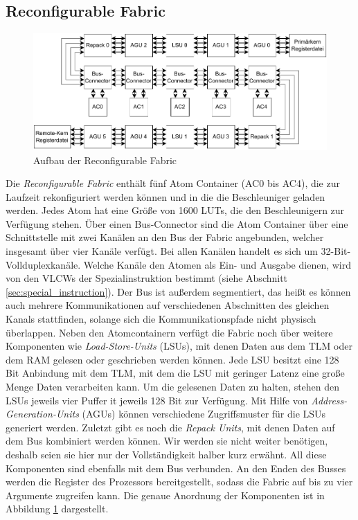\subsection{Reconfigurable Fabric}
\begin{figure}
    \center
    \includegraphics{images/Icore_Fabric.pdf}
    \caption{Aufbau der Reconfigurable Fabric}
    \label{fig:icore_fabric}
\end{figure}
Die \textit{Reconfigurable Fabric} enthält fünf Atom Container (AC0 bis AC4), die zur Laufzeit rekonfiguriert werden können und in die die Beschleuniger geladen werden.
Jedes Atom hat eine Größe von 1600 LUTs, die den Beschleunigern zur Verfügung stehen. Über einen Bus-Connector sind die Atom Container über eine Schnittstelle mit zwei Kanälen
an den Bus der Fabric angebunden, welcher insgesamt über vier Kanäle verfügt. Bei allen Kanälen handelt es sich um 32-Bit-Vollduplexkanäle.
Welche Kanäle den Atomen als Ein- und Ausgabe dienen, wird von den VLCWs der Spezialinstruktion bestimmt (siehe Abschnitt \ref{sec:special_instruction}). 
Der Bus ist außerdem segmentiert, das heißt es können auch mehrere Kommunikationen auf verschiedenen Abschnitten des gleichen Kanals stattfinden,
solange sich die Kommunikationspfade nicht physisch überlappen. Neben den Atomcontainern verfügt die Fabric
noch über weitere Komponenten wie \textit{Load-Store-Units} (LSUs), mit denen Daten aus dem TLM oder dem RAM gelesen oder geschrieben werden können.
Jede LSU besitzt eine 128 Bit Anbindung mit dem TLM, mit dem die LSU mit geringer Latenz eine große Menge Daten verarbeiten kann.
Um die gelesenen Daten zu halten, stehen den LSUs jeweils vier Puffer it jeweils 128 Bit zur Verfügung. Mit Hilfe von \textit{Address-Generation-Units} (AGUs)
können verschiedene Zugriffsmuster für die LSUs generiert werden. Zuletzt gibt es noch die \textit{Repack Units}, mit denen Daten auf dem Bus
kombiniert werden können. Wir werden sie nicht weiter benötigen, deshalb seien sie hier nur der Vollständigkeit halber kurz erwähnt.
All diese Komponenten sind ebenfalls mit dem Bus verbunden. An den Enden des Busses werden die Register des Prozessors bereitgestellt,
sodass die Fabric auf bis zu vier Argumente zugreifen kann. Die genaue Anordnung der Komponenten ist in Abbildung \ref{fig:icore_fabric} dargestellt.

